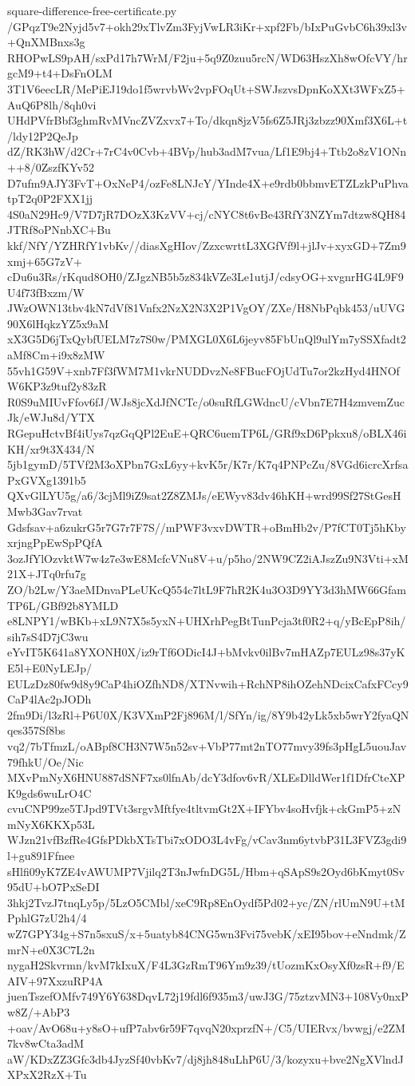 \documentclass[11pt]{article}
\theoremstyle{definition}
\theoremstyle{remark}
\begin{document}
\begin{filecontents*}[overwrite]{square-difference-free-certificate.py}
/GPqzT9e2Nyjd5v7+okh29xTlvZm3FyjVwLR3iKr+xpf2Fb/bIxPuGvbC6h39xl3v+QnXMBnxs3g
RHOPwLS9pAH/sxPd17h7WrM/F2ju+5q9Z0zuu5rcN/WD63HszXh8wOfcVY/hrgcM9+t4+DsFnOLM
3T1V6eecLR/MePiEJ19do1f5wrvbWv2vpFOqUt+SWJszvsDpnKoXXt3WFxZ5+AuQ6P8lh/8qh0vi
UHdPVfrBbf3ghmRvMVncZVZxvx7+To/dkqn8jzV5fs6Z5JRj3zbzz90Xmf3X6L+t/ldy12P2QeJp
dZ/RK3hW/d2Cr+7rC4v0Cvb+4BVp/hub3adM7vua/Lf1E9bj4+Ttb2o8zV1ONn++8/0ZszfKYv52
D7ufm9AJY3FvT+OxNeP4/ozFe8LNJcY/YInde4X+e9rdb0bbmvETZLzkPuPhvatpT2q0P2FXX1jj
4S0aN29Hc9/V7D7jR7DOzX3KzVV+cj/cNYC8t6vBe43RfY3NZYm7dtzw8QH84JTRf8oPNnbXC+Bu
kkf/NfY/YZHRfY1vbKv//diasXgHIov/ZzxcwrttL3XGfVf9l+jlJv+xyxGD+7Zm9xmj+65G7zV+
cDu6u3Rs/rKqud8OH0/ZJgzNB5b5z834kVZe3Le1utjJ/cdsyOG+xvgnrHG4L9F9U4f73fBxzm/W
JWzOWN13tbv4kN7dVf81Vnfx2NzX2N3X2P1VgOY/ZXe/H8NbPqbk453/uUVG90X6lHqkzYZ5x9aM
xX3G5D6jTxQybfUELM7z7S0w/PMXGL0X6L6jeyv85FbUnQl9ulYm7ySSXfadt2aMf8Cm+i9x8zMW
55vh1G59V+xnb7Ff3fWM7M1vkrNUDDvzNe8FBucFOjUdTu7or2kzHyd4HNOfW6KP3z9tuf2y83zR
R0S9uMIUvFfov6fJ/WJs8jcXdJfNCTc/o0suRfLGWdncU/cVbn7E7H4zmvemZucJk/eWJu8d/YTX
RGepuHctvBf4iUys7qzGqQPl2EuE+QRC6uemTP6L/GRf9xD6Ppkxu8/oBLX46iKH/xr9t3X434/N
5jb1gymD/5TVf2M3oXPbn7GxL6yy+kvK5r/K7r/K7q4PNPcZu/8VGd6icrcXrfsaPxGVXg1391b5
QXvGlLYU5g/a6/3cjMl9iZ9sat2Z8ZMJs/eEWyv83dv46hKH+wrd99Sf27StGesHMwb3Gav7rvat
Gdsfsav+a6zukrG5r7G7r7F7S//mPWF3vxvDWTR+oBmHb2v/P7fCT0Tj5hKbyxrjngPpEwSpPQfA
3ozJfYlOzvktW7w4z7e3wE8McfcVNu8V+u/p5ho/2NW9CZ2iAJszZu9N3Vti+xM21X+JTq0rfu7g
ZO/b2Lw/Y3aeMDnvaPLeUKcQ554c7ltL9F7hR2K4u3O3D9YY3d3hMW66GfamTP6L/GBf92b8YMLD
e8LNPY1/wBKb+xL9N7X5s5yxN+UHXrhPegBtTunPcja3tf0R2+q/yBcEpP8ih/sih7sS4D7jC3wu
eYvIT5K641a8YXONH0X/iz9rTf6ODicI4J+bMvkv0ilBv7mHAZp7EULz98s37yKE5l+E0NyLEJp/
EULzDz80fw9d8y9CaP4hiOZfhND8/XTNvwih+RchNP8ihOZehNDcixCafxFCcy9CaP4lAc2pJODh
2fm9Di/l3zRl+P6U0X/K3VXmP2Fj896M/l/SfYn/ig/8Y9b42yLk5xb5wrY2fyaQNqes357Sf8bs
vq2/7bTfmzL/oABpf8CH3N7W5n52sv+VbP77mt2nTO77mvy39fs3pHgL5uouJav79fhkU/Oe/Nic
MXvPmNyX6HNU887dSNF7xs0lfnAb/dcY3dfov6vR/XLEsDlldWer1f1DfrCteXPK9gds6wuLrO4C
cvuCNP99ze5TJpd9TVt3srgvMftfye4tltvmGt2X+IFYbv4soHvfjk+ckGmP5+zNmNyX6KKXp53L
WJzn21vfBzfRe4GfsPDkbXTsTbi7xODO3L4vFg/vCav3nm6ytvbP31L3FVZ3gdi9l+gu891Ffnee
sHlfi09yK7ZE4vAWUMP7Vjilq2T3nJwfnDG5L/Hbm+qSApS9s2Oyd6bKmyt0Sv95dU+bO7PxSeDI
3hkj2TvzJ7tnqLy5p/5LzO5CMbl/xeC9Rp8EnOydf5Pd02+yc/ZN/rlUmN9U+tMPphlG7zU2h4/4
wZ7GPY34g+S7n5sxuS/x+5uatyb84CNG5wn3Fvi75vebK/xEI95bov+eNndmk/ZmrN+e0X3C7L2n
nygaH2Skvrmn/kvM7kIxuX/F4L3GzRmT96Ym9z39/tUozmKxOsyXf0zsR+f9/EAIV+97XxzuRP4A
juenTszefOMfv749Y6Y638DqvL72j19fdl6f935m3/uwJ3G/75ztzvMN3+108Vy0nxPw8Z/+AbP3
+oav/AvO68u+y8sO+ufP7abv6r59F7qvqN20xprzfN+/C5/UIERvx/bvwgj/e2ZM7kv8wCta3adM
aW/KDxZZ3Gfc3db4JyzSf40vbKv7/dj8jh848uLhP6U/3/kozyxu+bve2NgXVlndJXPxX2RzX+Tu

\end{filecontents*}
\end{document}
